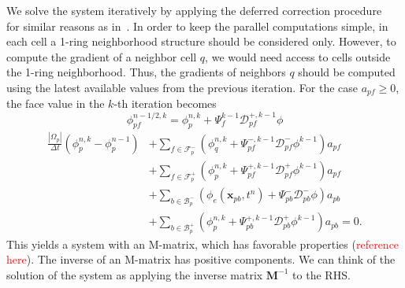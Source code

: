 \documentclass[../thesis.tex]{subfiles}
\begin{document}
We solve the system iteratively by applying the deferred correction procedure~\cite{2016_Moukalled_BOOK} for similar reasons as in~\cite{2019_Hahn}.
In order to keep the parallel computations simple, in each cell a 1-ring neighborhood structure should be considered only.
However, to compute the gradient of a neighbor cell \(q\), we would need access to cells outside the 1-ring neighborhood. Thus, the gradients of neighbors \( q \) should be computed using the latest available values from the previous iteration.
For the case \(a_{pf} \geq 0\), the face value in the \(k\)-th iteration becomes
\begin{equation}
	\phi_{pf}^{n-1/2,k} = \phi_p^{n,k} + \Psi_{f}^{k-1} \mathcal{D}^{+,k-1}_{pf}\phi
\end{equation}
\begin{equation}
	\begin{split}
		\frac{|\Omega_p|}{\Delta t}(\phi^{n,k}_p - \phi_p^{n-1})
		&+ \sum_{f \in \mathcal{F}_p^-}
		\left(
			\phi_q^{n,k} +\Psi_{pf}^{-, k-1}\mathcal{D}^-_{pf}\phi^{k-1}
		\right) a_{pf}\\
		&+ \sum_{f \in \mathcal{F}_p^+}
		\left(
			\phi_p^{n,k} + \Psi_{pf}^{+, k-1}\mathcal{D}^+_{pf}\phi^{k-1}
		\right) a_{pf}\\
		&+ \sum_{b \in \mathcal{B}_p^-}
		\left(
			\phi_e(\mathbf{x}_{pb}, t^{n})
			+ \Psi_{pb}^-\mathcal{D}^-_{pb}\phi
		\right) a_{pb}\\
		&+ \sum_{b \in \mathcal{B}_p^+}
		\left(\phi_p^{n,k} +
		\Psi_{pb}^{+, k-1}\mathcal{D}^+_{pb}\phi^{k-1}\right) a_{pb} = 0.
	\end{split}
\end{equation}
This yields a system with an M-matrix, which has favorable properties (\textcolor{red}{reference here}). The inverse of an M-matrix has positive components. We can think of the solution of the system as applying the inverse matrix \(\mathbf{M}^{-1}\) to the RHS.
\end{document}
